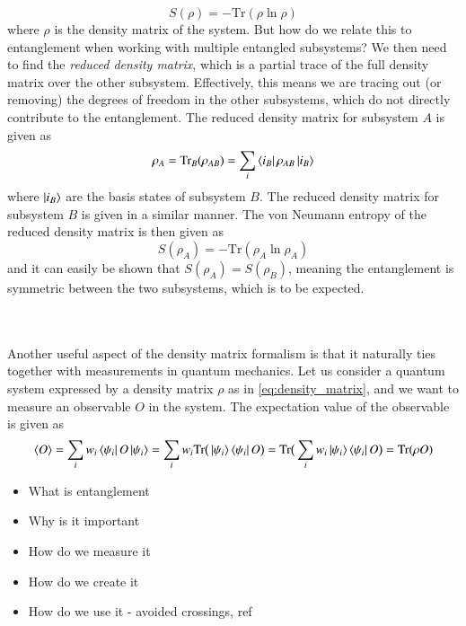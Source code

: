 \documentclass{subfiles}
\begin{document}
\begin{equation}
    S(\rho) = -\text{Tr}(\rho \ln \rho)
\end{equation}
where $\rho$ is the density matrix of the system. But how do we relate this to entanglement when working with multiple entangled subsystems? We then need to find the \emph{reduced density matrix}, which is a partial trace of the full density matrix over the other subsystem. Effectively, this means we are tracing out (or removing) the degrees of freedom in the other subsystems, which do not directly contribute to the entanglement. The reduced density matrix for subsystem $A$ is given as
\begin{equation}
    \rho_A = \text{Tr}_B(\rho_{AB}) = \sum_{i}\bra{i_B}\rho_{AB}\ket{i_B}
\end{equation}
where $\ket{i_B}$ are the basis states of subsystem $B$. The reduced density matrix for subsystem $B$ is given in a similar manner. The von Neumann entropy of the reduced density matrix is then given as
\begin{equation}
    S(\rho_A) = -\text{Tr}(\rho_A \ln \rho_A)
\end{equation}
and it can easily be shown that $S(\rho_A) = S(\rho_B)$, meaning the entanglement is symmetric between the two subsystems, which is to be expected. 


\\\\ 
Another useful aspect of the density matrix formalism is that it naturally ties together with measurements in quantum mechanics. Let us consider a quantum system expressed by a density matrix $\rho$ as in \eqref{eq:density_matrix}, and we want to measure an observable $O$ in the system. The expectation value of the observable is given as
\begin{align*}
    \braket{O} = \sum_i w_i\bra{\psi_i}O\ket{\psi_i} = \sum_i w_i\text{Tr}\big(\ket{\psi_i}\bra{\psi_i}O\big) = \text{Tr}\big(\sum_i w_i \ket{\psi_i}\bra{\psi_i}O\big) = \text{Tr}(\rho O)
\end{align*}

\begin{itemize}
    \item What is entanglement
    \item Why is it important
    \item How do we measure it
    \item How do we create it
    \item How do we use it - avoided crossings, ref \cite{nazir2005anticrossings}
\end{itemize}
\end{document}

